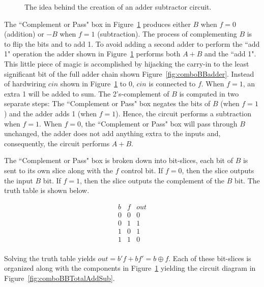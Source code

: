     \begin{figure}[ht]
        \caption{The idea behind the creation of an adder subtractor circuit.}
        \label{fig:comboBBAddSub}
    \end{figure}

    The ``Complement or Pass" box in Figure~\ref{fig:comboBBAddSub} produces
    either $B$ when $f=0$ (addition) or $-B$ when $f=1$ (subtraction).
    The process of complementing $B$ is to flip the bits and to add 1.
    To avoid adding a second adder to perform the ``add 1"
    operation the adder shown in Figure~\ref{fig:comboBBAddSub} performs
    both $A+B$ and the ``add 1".  This little piece of magic is
    accomplished by hijacking the carry-in to the least significant
    bit of the full adder chain shown Figure~\ref{fig:comboBBadder}.  Instead
    of hardwiring $cin$ shown in Figure~\ref{fig:comboBBAddSub} to 0, $cin$ is
    connected to $f$.
    When $f=1$, an extra 1 will be added to sum. The 2's-complement of
    $B$ is computed in two separate steps: The ``Complement or Pass" box
    negates the bits of $B$ (when $f=1$) and the adder adds 1
    (when $f=1$). Hence, the circuit performs a subtraction when $f=1$.
    When $f=0$, the ``Complement or Pass" box will pass through $B$
    unchanged, the adder does not add anything extra to the inputs and,
    consequently, the circuit performs $A+B$.

    The ``Complement or Pass" box is broken down into bit-slices, each
    bit of $B$ is sent to its own slice along with the $f$ control
    bit.  If $f=0$, then the slice outputs the input $B$ bit.  If $f=1$,
    then the slice outputs the complement of the $B$ bit.
    The truth table is shown below.

    $$
    \begin{array}{c|c||c}
        b & f & out \\ \hline
        0 & 0 & 0 \\ \hline
        0 & 1 & 1 \\ \hline
        1 & 0 & 1 \\ \hline
        1 & 1 & 0 \\
    \end{array}$$

    Solving the truth table yields $out = b'f + bf' = b \oplus f$.
    Each of these bit-slices is organized along with the components
    in Figure~\ref{fig:comboBBAddSub} yielding the circuit diagram in
    Figure~\ref{fig:comboBBTotalAddSub}.

